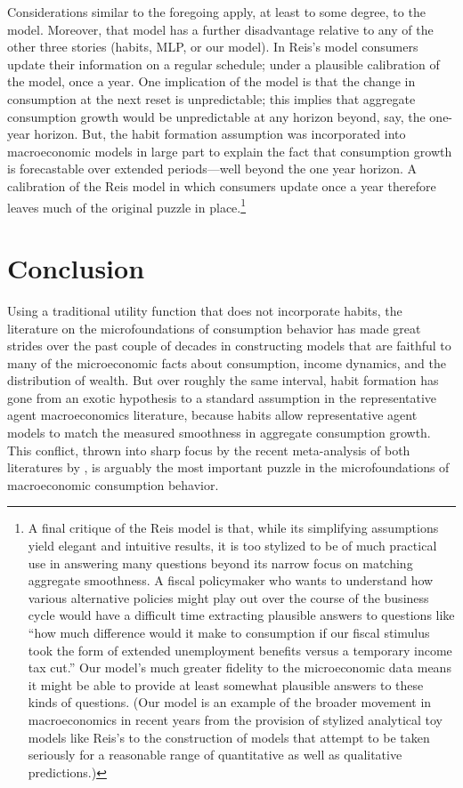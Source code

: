 \documentclass[titlepage]{\econtex}\newcommand{\texname}{cAndCwithStickyE}
\begin{document}
Considerations similar to the foregoing apply, at least to some degree, to the \cite{reis:inattentive} model.  Moreover, that model has a further disadvantage relative to any of the other three stories (habits, MLP, or our model). In Reis's model consumers update their information on a regular schedule; under a plausible calibration of the model, once a year.  One implication of the model is that the change in consumption at the next reset is unpredictable; this implies that aggregate consumption growth would be unpredictable at any horizon beyond, say, the one-year horizon.  But, the habit formation assumption was incorporated into macroeconomic models in large part to explain the fact that consumption growth is forecastable over extended periods---well beyond the one year horizon.  A calibration of the Reis model in which consumers update once a year therefore leaves much of the original puzzle in place.\footnote{A final critique of the Reis model is that, while its simplifying assumptions yield elegant and intuitive results, it is too stylized to be of much practical use in answering many questions beyond its narrow focus on matching aggregate smoothness.  A fiscal policymaker who wants to understand how various alternative policies might play out over the course of the business cycle would have a difficult time extracting plausible answers to questions like ``how much difference would it make to consumption if our fiscal stimulus took the form of extended unemployment benefits versus a temporary income tax cut.''  Our model's much greater fidelity to the microeconomic data means it might be able to provide at least somewhat plausible answers to these kinds of questions.  (Our model is an example of the broader movement in macroeconomics in recent years from the provision of stylized analytical toy models like Reis's to the construction of models that attempt to be taken seriously for a reasonable range of quantitative as well as qualitative predictions.)}


\section{Conclusion} \label{sec:Conclusion}

Using a traditional utility function that does not incorporate habits, the literature on the microfoundations of consumption behavior has made great strides over the past couple of decades in constructing models that are faithful to many of the microeconomic facts about consumption, income dynamics, and the distribution of wealth.  But over roughly the same interval, habit formation has gone from an exotic hypothesis to a standard assumption in the representative agent macroeconomics literature, because habits allow representative agent models to match the measured smoothness in aggregate consumption growth.  This conflict, thrown into sharp focus by the recent meta-analysis of both literatures by \cite{hrsHabit}, is arguably the most important puzzle in the microfoundations of macroeconomic consumption behavior.
\end{document}
